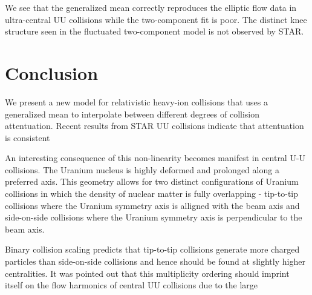 \documentclass[aps,prl,reprint,amsmath,nofootinbib]{revtex4-1}
\begin{document}
We see that the generalized mean correctly reproduces the elliptic flow data in ultra-central UU collisions while the two-component fit is poor. The distinct knee structure seen
in the fluctuated two-component model is not observed by STAR. 


\section{Conclusion}

We present a new model for relativistic heavy-ion collisions that uses a generalized mean to interpolate between different degrees of collision attentuation. Recent results from STAR UU collisions indicate that attentuation is consistent 

An interesting consequence of this non-linearity becomes manifest in central U-U collisions. The Uranium nucleus is highly deformed and prolonged along a preferred
axis. This geometry allows for two distinct configurations of Uranium collisions in which the density of nuclear matter is fully overlapping - tip-to-tip collisions
where the Uranium symmetry axis is alligned with the beam axis and side-on-side collisions where the Uranium symmetry axis is perpendicular to the beam axis.

Binary collision scaling predicts that tip-to-tip collisions generate more charged particles than side-on-side collisions and hence should be found at slightly
higher centralities. It was pointed out that this multiplicity ordering should imprint itself on the flow harmonics of central UU collisions due to the large 


\end{document}
